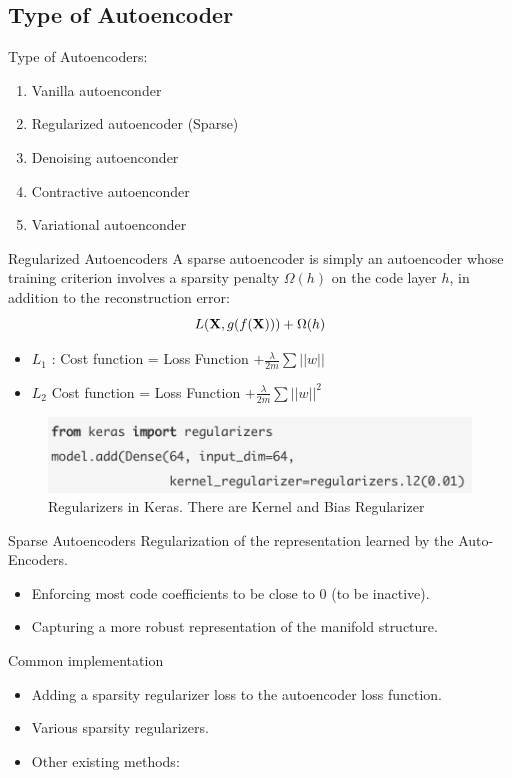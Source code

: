 \documentclass[xcolor=pdftex,dvipsnames,table,mathserif]{beamer}
\begin{document}
\subsection{Type of Autoencoder}
\begin{frame}{Type of Autoencoders:}
\begin{enumerate}
\item Vanilla autoenconder
\item Regularized autoencoder (Sparse)
\item Denoising autoenconder
\item Contractive autoenconder
\item Variational autoenconder
\end{enumerate}
\end{frame}




\begin{frame}{Regularized Autoencoders}
A sparse autoencoder is simply an autoencoder whose training criterion involves a
sparsity penalty $\Omega(h)$ on the code layer $h$, in addition to the reconstruction error:
\begin{equation}
L ( \mathbf{X} , g(f(\mathbf{X})))+\Omega(h)
\end{equation}
\begin{itemize}
\item $L_1$ : Cost function = Loss Function $+ \frac{\lambda}{2 m } \sum ||w||$
\item $L_2$  Cost function = Loss Function $+ \frac{\lambda}{2 m } \sum ||w||^2$
\end{itemize}
\begin{figure}
\includegraphics[width=.8\columnwidth]{../graphics/regularizers}
\caption{Regularizers in Keras. There are Kernel and Bias Regularizer}
\end{figure}
\end{frame}

\begin{frame}{Sparse Autoencoders}
Regularization of the representation learned by the Auto-Encoders.
\begin{itemize}
\item Enforcing most code coefficients to be close to 0 (to be inactive).
\item Capturing a more robust representation of the manifold structure.
\end{itemize}
Common implementation
\begin{itemize}
\item Adding a sparsity regularizer loss to the autoencoder loss function.
\item Various sparsity regularizers.
\item Other existing methods: 
\end{itemize}
\end{frame}
\end{document}
